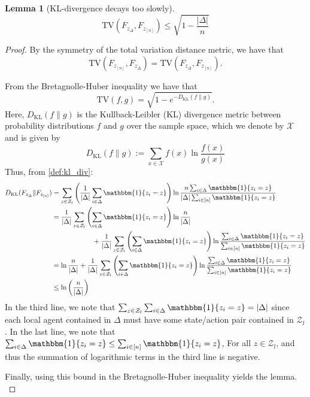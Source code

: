 \documentclass{article}
\theoremstyle{plain}
\newtheorem{lemma}[theorem]{Lemma}
\theoremstyle{definition}
\begin{document}
\begin{lemma}[KL-divergence decays too slowly]\label{lemma: tv_distance_bretagnolle_huber}
\[\mathrm{TV}(F_{z_\Delta}, F_{z_{[n]}}) \leq \sqrt{1- \frac{|\Delta|}{n}}\]
\end{lemma}
\begin{proof}
    By the symmetry of the total variation distance metric, we have that \[\mathrm{TV}(F_{z_{[n]}}, F_{z_{\Delta}}) = \mathrm{TV}(F_{z_{\Delta}}, F_{z_{[n]}}).\]
    
    From the Bretagnolle-Huber inequality \cite{10.5555/1522486} we have that
    \[\mathrm{TV}(f, g) = \sqrt{1 - e^{-D_{\mathrm{KL}}(f\|g)}}.\] Here, $D_{\mathrm{KL}}(f\|g)$ is the Kullback-Leibler (KL) divergence metric between probability distributions $f$ and $g$ over the sample space, which we denote by $\mathcal{X}$ and is given by \begin{equation}\label{def:kl_div}D_{\mathrm{KL}}(f\|g) := \sum_{x\in \mathcal{X}}f(x)\ln\frac{f(x)}{g(x)}\end{equation}Thus, from \cref{def:kl_div}:
\begin{align*}
    D_{\mathrm{KL}}(F_{z_\Delta}\|F_{z_{[n]}}) &= \sum_{z\in\mathcal{Z}_l}\left(\frac{1}{|\Delta|} \sum_{i\in\Delta} \mathbbm{1}\{z_i = z\}\right)\ln \frac{n\sum_{i\in\Delta}\mathbbm{1}\{z_i=z\}}{|\Delta|\sum_{i\in[n]}\mathbbm{1}\{z_i=z\}} \\
    &= \frac{1}{|\Delta|}\sum_{z\in\mathcal{Z}_l}\left(\sum_{i\in\Delta} \mathbbm{1}\{z_i = z\}\right)\ln \frac{n}{|\Delta|} \\
    &\quad\quad\quad\quad\quad\quad+ \frac{1}{|\Delta|}\sum_{z\in\mathcal{Z}_l}\left(\sum_{i\in\Delta} \mathbbm{1}\{z_i = z\}\right) \ln \frac{\sum_{i\in\Delta}\mathbbm{1}\{z_i=z\}}{\sum_{i\in[n]}\mathbbm{1}\{z_i=z\}} \\
    &= \ln \frac{n}{|\Delta|} + \frac{1}{|\Delta|}\sum_{z\in\mathcal{Z}_l}\left(\sum_{i\in\Delta} \mathbbm{1}\{z_i = z\}\right) \ln \frac{\sum_{i\in\Delta}\mathbbm{1}\{z_i=z\}}{\sum_{i\in[n]}\mathbbm{1}\{z_i=z\}} \\
    &\leq \ln \left(\frac{n}{|\Delta|}\right)
\end{align*}
In the third line, we note that $\sum_{z\in\mathcal{Z}_l}\sum_{i\in\Delta}\mathbbm{1}\{z_i=z\} = |\Delta|$ since each local agent contained in $\Delta$ must have some state/action pair contained in $\mathcal{Z}_l$. In the last line, we note that $\sum_{i\in\Delta}\mathbbm{1}\{z_i=z\}\leq \sum_{i\in[n]}\mathbbm{1}\{z_i = z\}$, For all $z\in \mathcal{Z}_l$, and thus the summation of logarithmic terms in the third line is negative. 

Finally, using this bound in the Bretagnolle-Huber inequality yields the lemma.\qedhere \\
\end{proof}
\end{document}
